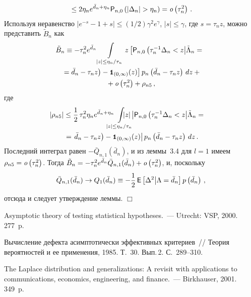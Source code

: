 \begin{multicols}{2}
\begin{multline*}
{}\leq 2\eta_n e^{\bar d_n+\eta_n}{\p}_{n,0}\left(\left|\Delta_n\right|>\eta_n\right)={\it o}\left(\tau_n^2\right)\,.
\end{multline*}
Используя неравенство
$
\left|e^{-s}-1+s\right|\leq (1/2)\gamma^2e^{\gamma}$, $\left|s\right|\leq\gamma$,
где $s=\tau_nz$, можно представить $\tilde B_n$ как
\begin{multline*}
\tilde B_n\equiv -\tau_n^2e^{\bar d_n}\int\limits_{|z|\leq\eta_n/\tau_n}
z\left[ {\p}_{n,0}\left(\tau_n^{-1}\Delta_n<z \big| \tilde\Lambda_n={}\right.\right.\\
\left.\left.{}=\bar d_n-\tau_nz
\vphantom{\tilde{\Lambda_n}}\right) - 
{\Ik}_{(0,\infty)}(z) \right]
p_n\left(\bar d_n - \tau_nz\right)\,dz+{}\\
{}+{\it o}\left(\tau_n^2\right)+\rho_{n5}\,,
\end{multline*}
где
\begin{multline*}
\!\!\!\!\left|\rho_{n5}\right|\leq \fr{1}{2}\,\tau_n^2\eta_n 
e^{\bar d_n+\eta_n}\!\!\!\!\!\!\int\limits_{\!|z|\leq\eta_n/\tau_n}
\!\!\!\!\!\!\!\!\!\!|z|\left| {\p}_{n,0}\left(\tau_n^{-1}\Delta_n<z\big| \tilde\Lambda_n={}\right.\right.\\
\left.{}=\left.\bar d_n-\tau_nz\vphantom{\tilde{\Lambda}_n}\right) - {\Ik}_{(0,\infty)}(z) 
\vphantom{\tilde{\Lambda}_n}\right|
 p_n\left(\bar d_n - \tau_nz\right)\,dz\,.
\end{multline*}
Последний интеграл равен $-\bar Q_{n,1}(\bar d_n)$, и 
из леммы~3.4 для $l=1$ имеем
$\rho_{n5}={\it o}\left(\tau_n^2\right)$.
Тогда
$\tilde B_n=-\tau_n^2 e^{\bar d_n}\bar Q_{n,1}(\bar d_n)+{\it o}\left(\tau_n^2\right)$,
и, поскольку
$$
\bar Q_{n,1}(\bar d_n)\rightarrow Q_{1}(\bar d_n)\equiv -\displaystyle\frac{\displaystyle 1\mathstrut}{\displaystyle 2\mathstrut}\,{{\sf E}}\left[\Delta^2\big|\Lambda=\bar d_n\right]
p\left(\bar d_n\right)\,,
$$
отсюда и следует утверждение леммы.
\hfill$\Box$


{\small\frenchspacing
{%
\begin{thebibliography}{99}

Asymptotic theory of testing statistical hypotheses.~---
Utrecht: VSP,  2000. 277~p.

Вычисление дефекта асимптотически эффективных критериев~// Теория вероятностей и ее применения, 1985. 
Т.~30. Вып.\,2. С.~289--310.

The Laplace distribution and generalizations:
A revisit with applications to communications, economics, engineering,
and finance.~--- Birkhauser, 2001. 349~p.


\end{thebibliography}}}
\end{multicols}
